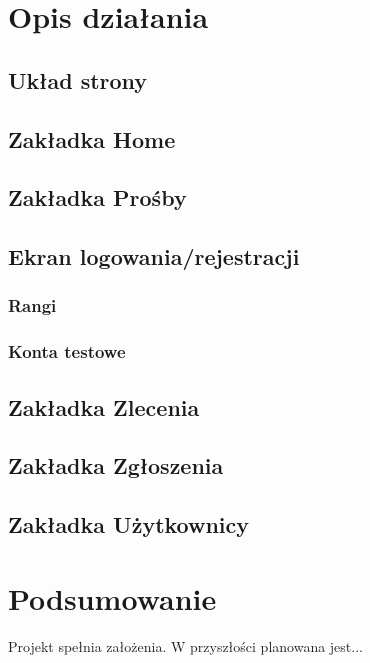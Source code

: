 \documentclass[a4paper,12pt]{article}
\begin{document}
\section{Opis działania}
\subsection{Układ strony}
\subsection{Zakładka Home}
\subsection{Zakładka Prośby}
\subsection{Ekran logowania/rejestracji}
\subsubsection{Rangi}
\subsubsection{Konta testowe}
\subsection{Zakładka Zlecenia}
\subsection{Zakładka Zgłoszenia}
\subsection{Zakładka Użytkownicy}

\section{Podsumowanie}
Projekt spełnia założenia. W przyszłości planowana jest...
\end{document}
